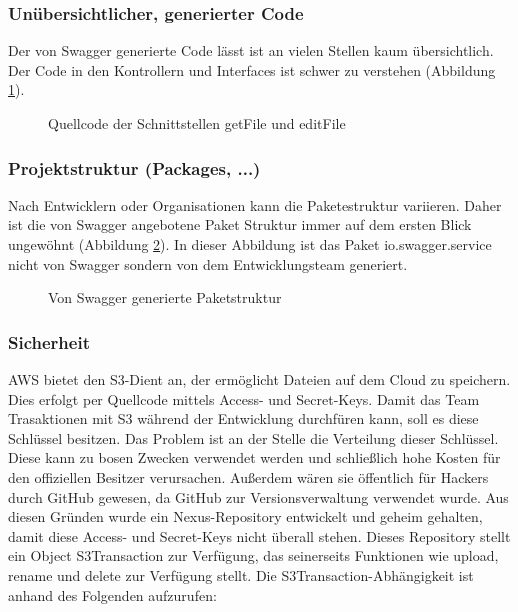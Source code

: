 \documentclass[a4paper,twoside]{article}
\begin{document}
		\subsubsection{Un\"ubersichtlicher, generierter Code}
			
			Der von Swagger generierte Code l\"asst ist an vielen Stellen kaum \"ubersichtlich. Der Code in den Kontrollern und Interfaces ist schwer zu verstehen  (Abbildung \ref{fig:quellcode-der-schnittstellen-getFile-und-editFile}). 
			
			\begin{figure}[ht]
				\centering
				{}
				\caption{Quellcode der Schnittstellen getFile und editFile}
				\label{fig:quellcode-der-schnittstellen-getFile-und-editFile}
			\end{figure}
		
		\subsubsection{Projektstruktur (Packages, ...)}
		
			Nach Entwicklern oder Organisationen kann die Paketestruktur variieren. Daher ist die von Swagger angebotene Paket Struktur  immer auf dem ersten Blick ungew\"ohnt (Abbildung \ref{fig:von-swagger-generierte-paketstruktur}). In dieser Abbildung ist das Paket io.swagger.service nicht von Swagger sondern von dem Entwicklungsteam generiert.
			
			\begin{figure}[ht]
				\centering
				{}
				\caption{Von Swagger generierte Paketstruktur}
				\label{fig:von-swagger-generierte-paketstruktur}
			\end{figure}
		
		\subsubsection{Sicherheit}
		
			AWS bietet den S3-Dient an, der erm\"oglicht Dateien auf dem Cloud zu speichern. Dies erfolgt per Quellcode mittels Access- und Secret-Keys. Damit das Team Trasaktionen mit S3 w\"ahrend der Entwicklung durchf\"uren kann, soll es diese Schl\"ussel besitzen. Das Problem ist an der Stelle die Verteilung dieser Schl\"ussel. Diese kann zu bosen Zwecken verwendet werden und schlie\ss{}lich hohe Kosten f\"ur den offiziellen Besitzer verursachen. Au\ss{}erdem w\"aren sie \"offentlich f\"ur Hackers durch GitHub gewesen, da GitHub zur Versionsverwaltung verwendet wurde.
			Aus diesen Gr\"unden wurde ein Nexus-Repository entwickelt und geheim gehalten, damit diese Access- und Secret-Keys nicht \"uberall stehen. Dieses Repository stellt ein Object S3Transaction zur Verf\"ugung, das seinerseits Funktionen wie upload, rename und delete zur Verf\"ugung stellt. Die S3Transaction-Abh\"angigkeit ist anhand des Folgenden aufzurufen:
			
\end{document}
